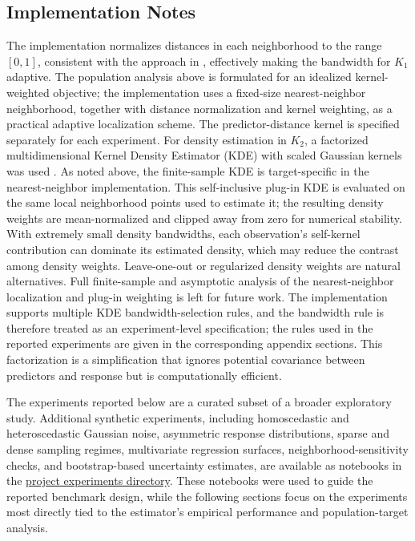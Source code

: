 \documentclass[preprint,1p,times,authoryear]{elsarticle}
\begin{document}
\subsection{Implementation Notes}
The implementation normalizes distances in each neighborhood to the range $[0, 1]$, consistent with the approach in \cite{cleveland79}, effectively making the bandwidth for $K_1$ adaptive. The population analysis above is formulated for an idealized kernel-weighted objective; the implementation uses a fixed-size nearest-neighbor neighborhood, together with distance normalization and kernel weighting, as a practical adaptive localization scheme. The predictor-distance kernel is specified separately for each experiment. For density estimation in $K_2$, a factorized multidimensional Kernel Density Estimator (KDE) with scaled Gaussian kernels was used \citep{Rosenblatt1956,Parzen1962}. As noted above, the finite-sample KDE is target-specific in the nearest-neighbor implementation. This self-inclusive plug-in KDE is evaluated on the same local neighborhood points used to estimate it; the resulting density weights are mean-normalized and clipped away from zero for numerical stability. With extremely small density bandwidths, each observation's self-kernel contribution can dominate its estimated density, which may reduce the contrast among density weights. Leave-one-out or regularized density weights are natural alternatives. Full finite-sample and asymptotic analysis of the nearest-neighbor localization and plug-in weighting is left for future work. The implementation supports multiple KDE bandwidth-selection rules, and the bandwidth rule is therefore treated as an experiment-level specification; the rules used in the reported experiments are given in the corresponding appendix sections. This factorization is a simplification that ignores potential covariance between predictors and response but is computationally efficient.

The experiments reported below are a curated subset of a broader exploratory study. Additional synthetic experiments, including homoscedastic and heteroscedastic Gaussian noise, asymmetric response distributions, sparse and dense sampling regimes, multivariate regression surfaces, neighborhood-sensitivity checks, and bootstrap-based uncertainty estimates, are available as notebooks in the \href{https://nbviewer.org/github/yaniv-shulman/rsklpr/tree/main/src/experiments}{project experiments directory}. These notebooks were used to guide the reported benchmark design, while the following sections focus on the experiments most directly tied to the estimator's empirical performance and population-target analysis.
\end{document}
